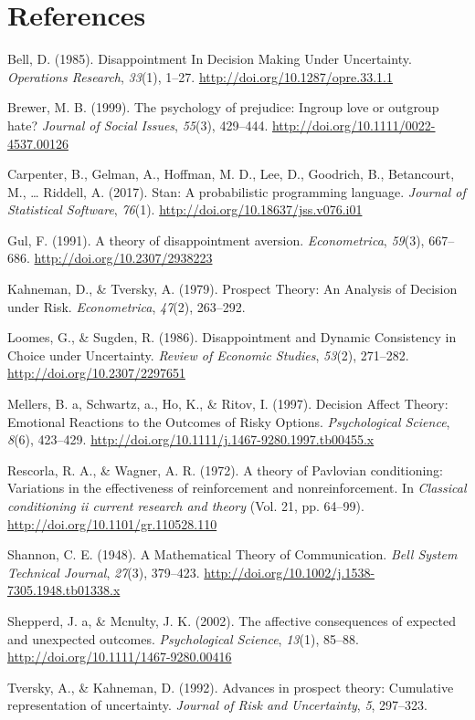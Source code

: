 \documentclass[]{article}
\begin{document}
\section{References}\label{references}

\setlength{\parindent}{-0.25in} \setlength{\leftskip}{0.125in} \noindent

\hypertarget{refs}{}
\hypertarget{ref-Bell1985}{}
Bell, D. (1985). Disappointment In Decision Making Under Uncertainty.
\emph{Operations Research}, \emph{33}(1), 1--27.
\url{http://doi.org/10.1287/opre.33.1.1}

\hypertarget{ref-Brewer1999}{}
Brewer, M. B. (1999). The psychology of prejudice: Ingroup love or
outgroup hate? \emph{Journal of Social Issues}, \emph{55}(3), 429--444.
\url{http://doi.org/10.1111/0022-4537.00126}

\hypertarget{ref-Carpenter2017}{}
Carpenter, B., Gelman, A., Hoffman, M. D., Lee, D., Goodrich, B.,
Betancourt, M., \ldots{} Riddell, A. (2017). Stan: A probabilistic
programming language. \emph{Journal of Statistical Software},
\emph{76}(1). \url{http://doi.org/10.18637/jss.v076.i01}

\hypertarget{ref-Gul1991}{}
Gul, F. (1991). A theory of disappointment aversion.
\emph{Econometrica}, \emph{59}(3), 667--686.
\url{http://doi.org/10.2307/2938223}

\hypertarget{ref-Kahneman1979}{}
Kahneman, D., \& Tversky, A. (1979). Prospect Theory: An Analysis of
Decision under Risk. \emph{Econometrica}, \emph{47}(2), 263--292.

\hypertarget{ref-Loomes1986}{}
Loomes, G., \& Sugden, R. (1986). Disappointment and Dynamic Consistency
in Choice under Uncertainty. \emph{Review of Economic Studies},
\emph{53}(2), 271--282. \url{http://doi.org/10.2307/2297651}

\hypertarget{ref-Mellers1997}{}
Mellers, B. a, Schwartz, a., Ho, K., \& Ritov, I. (1997). Decision
Affect Theory: Emotional Reactions to the Outcomes of Risky Options.
\emph{Psychological Science}, \emph{8}(6), 423--429.
\url{http://doi.org/10.1111/j.1467-9280.1997.tb00455.x}

\hypertarget{ref-Rescorla1972}{}
Rescorla, R. A., \& Wagner, A. R. (1972). A theory of Pavlovian
conditioning: Variations in the effectiveness of reinforcement and
nonreinforcement. In \emph{Classical conditioning ii current research
and theory} (Vol. 21, pp. 64--99).
\url{http://doi.org/10.1101/gr.110528.110}

\hypertarget{ref-Shannon1948}{}
Shannon, C. E. (1948). A Mathematical Theory of Communication.
\emph{Bell System Technical Journal}, \emph{27}(3), 379--423.
\url{http://doi.org/10.1002/j.1538-7305.1948.tb01338.x}

\hypertarget{ref-Shepperd2002}{}
Shepperd, J. a, \& Mcnulty, J. K. (2002). The affective consequences of
expected and unexpected outcomes. \emph{Psychological Science},
\emph{13}(1), 85--88. \url{http://doi.org/10.1111/1467-9280.00416}

\hypertarget{ref-Tversky1992}{}
Tversky, A., \& Kahneman, D. (1992). Advances in prospect theory:
Cumulative representation of uncertainty. \emph{Journal of Risk and
Uncertainty}, \emph{5}, 297--323.
\end{document}
